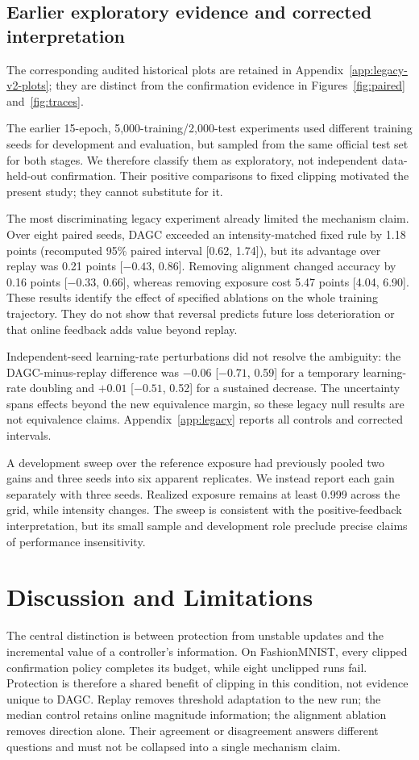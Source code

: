 \documentclass{article}
\begin{document}
\subsection{Earlier exploratory evidence and corrected interpretation}
The corresponding audited historical plots are retained in
Appendix~\ref{app:legacy-v2-plots}; they are distinct from the confirmation
evidence in Figures~\ref{fig:paired} and~\ref{fig:traces}.

The earlier 15-epoch, 5,000-training/2,000-test experiments used different
training seeds for development and evaluation, but sampled from the same
official test set for both stages. We therefore classify them as exploratory,
not independent data-held-out confirmation. Their positive comparisons to
fixed clipping motivated the present study; they cannot substitute for it.

The most discriminating legacy experiment already limited the mechanism
claim. Over eight paired seeds, DAGC exceeded an intensity-matched fixed rule
by 1.18 points (recomputed 95\% paired interval [0.62, 1.74]), but its advantage
over replay was 0.21 points [$-0.43$, 0.86]. Removing alignment changed accuracy
by 0.16 points [$-0.33$, 0.66], whereas removing exposure cost 5.47 points
[4.04, 6.90]. These results identify the effect of specified ablations on the
whole training trajectory. They do not show that reversal predicts future
loss deterioration or that online feedback adds value beyond replay.

Independent-seed learning-rate perturbations did not resolve the ambiguity:
the DAGC-minus-replay difference was $-0.06$ [$-0.71$, 0.59] for a temporary
learning-rate doubling and $+0.01$ [$-0.51$, 0.52] for a sustained decrease.
The uncertainty spans effects beyond the new equivalence margin, so these
legacy null results are not equivalence claims. Appendix~\ref{app:legacy}
reports all controls and corrected intervals.

A development sweep over the reference exposure had previously pooled two
gains and three seeds into six apparent replicates. We instead report each
gain separately with three seeds. Realized exposure remains at least 0.999
across the grid, while intensity changes. The sweep is consistent with the
positive-feedback interpretation, but its small sample and development role
preclude precise claims of performance insensitivity.

\section{Discussion and Limitations}
The central distinction is between protection from unstable updates and the
incremental value of a controller's information. On FashionMNIST, every clipped
confirmation policy completes its budget, while eight unclipped runs fail.
Protection is therefore a shared benefit of clipping in this condition, not
evidence unique to DAGC. Replay removes threshold adaptation to the new run;
the median control retains online magnitude information; the alignment ablation
removes direction alone. Their agreement or disagreement answers different
questions and must not be collapsed into a single mechanism claim.
\end{document}
